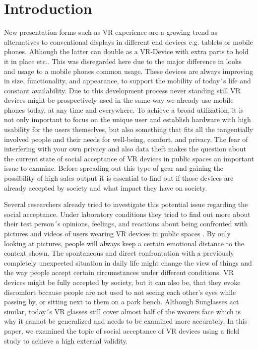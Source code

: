 \documentclass[sigchi]{acmart}
\begin{document}
\section{Introduction}
New presentation forms such as VR experience are a growing trend as alternatives to conventional displays in different end devices e.g. tablets or mobile phones. Although the latter can double as a VR-Device with extra parts to hold it in place etc.. This was disregarded here due to the major difference in looks and usage to a mobile phones common usage. These devices are always improving in size, functionality, and appearance, to support the mobility of today´s life and constant availability. Due to this development process never standing still VR devices might be prospectively used in the same way we already use mobile phones today, at any time and everywhere. To achieve a broad utilization, it is not only important to focus on the unique user and establish hardware with high usability for the users themselves, but also something that fits all the tangentially involved people and their needs for well-being, comfort, and privacy. The fear of interfering with your own privacy and also data theft makes the question about the current state of social acceptance of VR devices in public spaces an important issue to examine. Before spreading out this type of gear and gaining the possibility of high sales output it is essential to find out if those devices are already accepted by society and what impact they have on society.

Several researchers already tried to investigate this potential issue regarding the social acceptance. Under laboratory conditions they tried to find out more about their test person´s opinions, feelings, and reactions about being confronted with pictures and videos of users wearing VR devices in public spaces \cite{schwind2018virtual}. By only looking at pictures, people will always keep a certain emotional distance to the context shown. The spontaneous and direct confrontation with a previously completely unexpected situation in daily life might change the view of things and the way people accept certain circumstances under different conditions. VR devices might be fully accepted by society, but it can also be, that they evoke discomfort because people are not used to not seeing each other's eyes while passing by, or sitting next to them on a park bench. Although Sunglasses act similar, today´s VR glasses still cover almost half of the wearers face which is why it cannot be generalized and needs to be examined more accurately. 
In this paper, we examined the topic of social acceptance of VR devices using a field study to achieve a high external validity.
\end{document}
